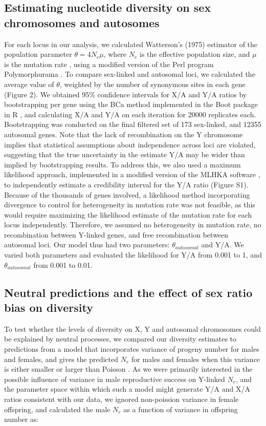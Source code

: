 \documentclass[9pt,twocolumn,twoside]{gsajnl}
\begin{document}
\subsection*{Estimating nucleotide diversity on sex chromosomes and autosomes}
For each locus in our analysis, we calculated Watterson’s (1975) estimator of the population parameter $\theta=4N_{e}\mu$, where $N_{e}$ is the effective population size, and $\mu$ is the mutation rate \citep{watterson1975}, using a modified version of the Perl program Polymorphurama \citep{bachtrog2006}. To compare sex-linked and autosomal loci, we calculated the average value of $\theta$, weighted by the number of synonymous sites in each gene (\X Figure 2). We obtained 95\% confidence intervals for X/A and Y/A ratios by bootstrapping per gene using the BCa method \citep{efron1994} implemented in the Boot package in R \citep{canty2012boot}, and calculating X/A and Y/A on each iteration for 20000 replicates each. Bootstrapping was conducted on the final filtered set of 173 sex-linked, and 12355 autosomal genes. Note that the lack of recombination on the Y chromosome implies that statistical assumptions about independence across loci are violated, suggesting that the true uncertainty in the estimate Y/A may be wider than implied by bootstrapping results. To address this, we also used a maximum likelihood approach, implemented in a modified version of the MLHKA software \citep{wright2004hka}, to independently estimate a credibility interval for the Y/A ratio (Figure S1). Because of the thousands of genes involved, a likelihood method incorporating divergence to control for heterogeneity in mutation rate was not feasible, as this would require maximizing the likelihood estimate of the mutation rate for each locus independently. Therefore, we assumed no heterogeneity in mutation rate, no recombination between Y-linked genes, and free recombination between autosomal loci. Our model thus had two parameters: $\theta_{autosomal}$ and Y/A. We varied both parameters and evaluated the likelihood for Y/A from 0.001 to 1, and $\theta_{autosomal}$ from 0.001 to 0.01.

\subsection*{Neutral predictions and the effect of sex ratio bias on diversity}
To test whether the levels of diversity on X, Y and autosomal chromosomes could be explained by neutral processes, we compared our diversity estimates to predictions from a model that incorporates variance of progeny number for males and females, and gives the predicted $N_{e}$ for males and females when this variance is either smaller or larger than Poisson \citep{kimura1964number, hedrick2011genetics}. As we were primarily interested in the possible influence of variance in male reproductive success on Y-linked $N_{e}$, and the parameter space within which such a model might generate Y/A and X/A ratios consistent with our data, we ignored non-poission variance in female offspring, and calculated the male $N_{e}$ as a function of variance in offspring number as:
\end{document}
